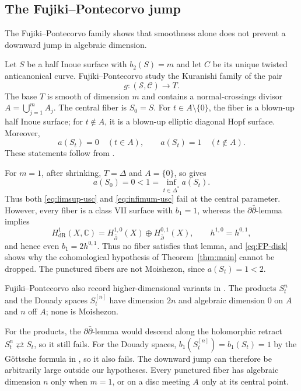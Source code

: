 \documentclass[11pt]{amsart}
\numberwithin{equation}{section}
\theoremstyle{plain}
\theoremstyle{definition}
\newcommand{\C}{\mathbb C}
\newcommand{\cC}{\mathcal C}
\newcommand{\cS}{\mathcal S}
\begin{document}
\subsection{The Fujiki--Pontecorvo jump}
\label{ss:FP-jump}

The Fujiki--Pontecorvo family shows that smoothness alone does not prevent
a downward jump in algebraic dimension.

Let $S$ be a half Inoue surface with $b_2(S)=m$ and let $C$ be its unique
twisted anticanonical curve.  Fujiki--Pontecorvo study the Kuranishi
family of the pair
\[
 g:(\cS,\cC)\longrightarrow T.
\]
The base $T$ is smooth of dimension $m$ and contains a normal-crossings
divisor $A=\bigcup_{j=1}^m A_j$.  The central fiber is $S_0=S$.
For $t\in A\setminus\{0\}$, the fiber is a
blown-up half Inoue surface; for $t\notin A$, it is a blown-up elliptic
diagonal Hopf surface.  Moreover,
\begin{equation*}
 a(S_t)=0\quad(t\in A),\qquad a(S_t)=1\quad(t\notin A).
\end{equation*}
These statements follow from
\cite[Theorem~1.1, Corollary~1.2, and Proposition~1.3]{FP10}.

For $m=1$, after shrinking, $T=\Delta$ and $A=\{0\}$, so
\cite[Example following Proposition~1.3]{FP10} gives
\begin{equation}\label{eq:FP-disk}
 a(S_0)=0<1=\inf_{t\in\Delta^*}a(S_t).
\end{equation}
Thus both \eqref{eq:limsup-usc} and \eqref{eq:infimum-usc} fail at the
central parameter.  However, every fiber is a class VII surface with
$b_1=1$, whereas the $\partial\bar\partial$-lemma implies
\[
 H^1_{\mathrm{dR}}(X,\C)=H^{1,0}_{\bar\partial}(X)
 \oplus H^{0,1}_{\bar\partial}(X),
 \qquad h^{1,0}=h^{0,1},
\]
and hence even $b_1=2h^{0,1}$.  Thus no fiber satisfies that lemma, and
\eqref{eq:FP-disk} shows why the cohomological hypothesis of
Theorem~\ref{thm:main} cannot be dropped.  The punctured fibers are not
Moishezon, since $a(S_t)=1<2$.

Fujiki--Pontecorvo also record higher-dimensional variants in
\cite[Remark~1.1]{FP10}.  The products $S_t^n$ and the Douady spaces
$S_t^{[n]}$ have dimension $2n$ and algebraic dimension $0$ on $A$ and
$n$ off $A$; none is Moishezon.

For the products, the $\partial\bar\partial$-lemma would descend along the
holomorphic retract $S_t^n\rightleftarrows S_t$, so it still fails.  For
the Douady spaces,
$b_1(S_t^{[n]})=b_1(S_t)=1$ by the G\"ottsche formula in
\cite[Theorem~5.2.1.(2)]{DM00}, so it also fails.  The downward jump can
therefore be arbitrarily large outside our hypotheses.  Every punctured
fiber has algebraic dimension $n$ only when $m=1$, or on a disc meeting
$A$ only at its central point.
\end{document}
